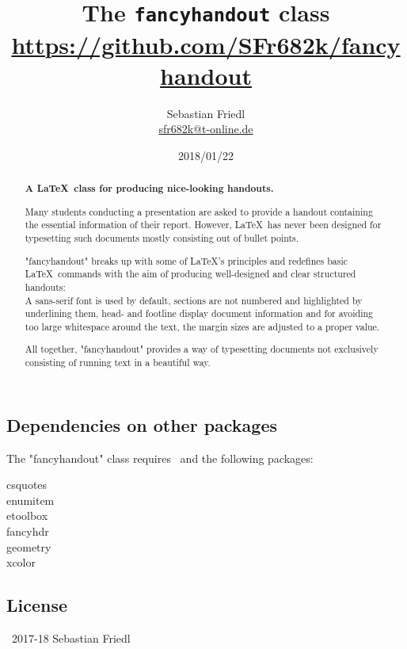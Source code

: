 \documentclass[11pt]{ltxdoc}
\title{The \texttt{fancyhandout} class \\ {\large\url{https://github.com/SFr682k/fancyhandout}}}
\author{Sebastian Friedl \\ \href{mailto:sfr682k@t-online.de}{\ttfamily sfr682k@t-online.de}}
\date{2018/01/22}
\begin{document}
	\maketitle
	
	\begin{abstract}\parindent0pt%
		\noindent%
		\textbf{A \LaTeX\ class for producing nice-looking handouts.}
		
		\smallskip
		Many students conducting a presentation are asked to provide a handout containing the essential information of their report.
		However, \LaTeX\ has never been designed for typesetting such documents mostly consisting out of bullet points.
		
		\smallskip
		"fancyhandout" breaks up with some of \LaTeX's principles and redefines basic \LaTeX\ commands with the aim of producing well-designed and clear structured handouts: \\
		A \textsf{sans-serif} font is used by default, sections are not numbered and highlighted by underlining them, head- and footline display document information and for avoiding too large whitespace around the text, the margin sizes are adjusted to a proper value.
		
		\smallskip
		All together, "fancyhandout" provides a way of typesetting documents not exclusively consisting of running text in a beautiful way.
	\end{abstract}

	
	\tableofcontents
	\clearpage
	
	
	
	\subsection*{Dependencies on other packages}
	The "fancyhandout" class requires \LaTeXe\ and the following packages:
	\begin{multicols}{3}\ttfamily\centering
		csquotes \\ enumitem \\ etoolbox \\ fancyhdr \\ geometry \\ xcolor
	\end{multicols}
	
	\subsection*{License}
	\textcopyright\ 2017-18 Sebastian Friedl
	
\end{document}
